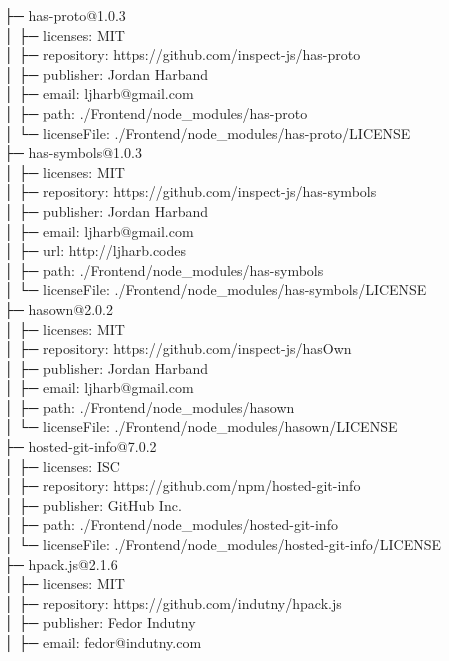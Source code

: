 ├─ has-proto@1.0.3\\
│  ├─ licenses: MIT\\
│  ├─ repository: https://github.com/inspect-js/has-proto\\
│  ├─ publisher: Jordan Harband\\
│  ├─ email: ljharb@gmail.com\\
│  ├─ path: ./Frontend/node\_modules/has-proto\\
│  └─ licenseFile: ./Frontend/node\_modules/has-proto/LICENSE\\
├─ has-symbols@1.0.3\\
│  ├─ licenses: MIT\\
│  ├─ repository: https://github.com/inspect-js/has-symbols\\
│  ├─ publisher: Jordan Harband\\
│  ├─ email: ljharb@gmail.com\\
│  ├─ url: http://ljharb.codes\\
│  ├─ path: ./Frontend/node\_modules/has-symbols\\
│  └─ licenseFile: ./Frontend/node\_modules/has-symbols/LICENSE\\
├─ hasown@2.0.2\\
│  ├─ licenses: MIT\\
│  ├─ repository: https://github.com/inspect-js/hasOwn\\
│  ├─ publisher: Jordan Harband\\
│  ├─ email: ljharb@gmail.com\\
│  ├─ path: ./Frontend/node\_modules/hasown\\
│  └─ licenseFile: ./Frontend/node\_modules/hasown/LICENSE\\
├─ hosted-git-info@7.0.2\\
│  ├─ licenses: ISC\\
│  ├─ repository: https://github.com/npm/hosted-git-info\\
│  ├─ publisher: GitHub Inc.\\
│  ├─ path: ./Frontend/node\_modules/hosted-git-info\\
│  └─ licenseFile: ./Frontend/node\_modules/hosted-git-info/LICENSE\\
├─ hpack.js@2.1.6\\
│  ├─ licenses: MIT\\
│  ├─ repository: https://github.com/indutny/hpack.js\\
│  ├─ publisher: Fedor Indutny\\
│  ├─ email: fedor@indutny.com\\
